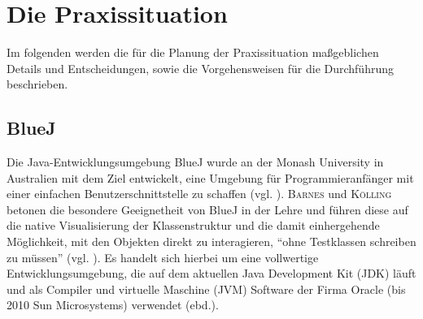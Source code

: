 \documentclass[paper=a4, DIV=13, BCOR=12mm, twoside=on, onecolumn=on, open = any, titlepage =on, parskip =half-, headsepline = on, footsepline = on, chapterprefix = on, sectionprefix = on, appendixprefix = off, fontsize = 11pt, numbers = noenddot, abstract = off]{scrreprt}
\begin{document}
\chapter{Die Praxissituation}
\onehalfspacing
 Im folgenden werden die für die Planung der Praxissituation maßgeblichen Details und Entscheidungen, sowie die Vorgehensweisen für die Durchführung beschrieben. 
\par \singlespacing
 \section{BlueJ}
\onehalfspacing
\label{sec:bluej}
Die Java-Entwicklungsumgebung BlueJ wurde an der Monash University in Australien mit dem Ziel entwickelt, eine Umgebung für Programmieranfänger mit einer einfachen Benutzerschnittstelle zu schaffen (vgl. \cite[S.14]{barnes:03}). \textsc{Barnes} und \textsc{Kölling} betonen die besondere Geeignetheit von BlueJ in der Lehre und führen diese auf die native Visualisierung der Klassenstruktur und die damit einhergehende Möglichkeit, mit den Objekten direkt zu interagieren, "`ohne Testklassen schreiben zu müssen"' (vgl. \cite[S.15]{barnes:03}). Es handelt sich hierbei um eine vollwertige Entwicklungsumgebung, die auf dem aktuellen Java Development Kit (JDK) läuft und als Compiler und virtuelle Maschine (JVM) Software der Firma Oracle (bis 2010 Sun Microsystems) verwendet (ebd.).


\end{document}
